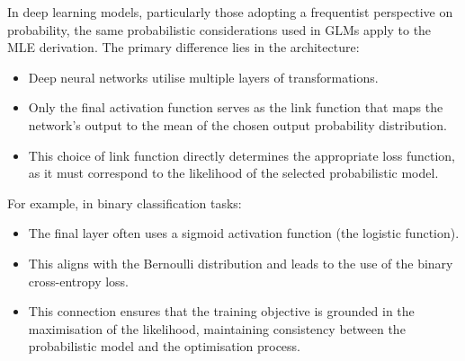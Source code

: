 In deep learning models, particularly those adopting a frequentist perspective on probability, the same probabilistic considerations used in GLMs apply to the MLE derivation. The primary difference lies in the architecture:
\begin{itemize}
    \item Deep neural networks utilise multiple layers of transformations.
    \item Only the final activation function serves as the link function that maps the network's output to the mean of the chosen output probability distribution.
    \item This choice of link function directly determines the appropriate loss function, as it must correspond to the likelihood of the selected probabilistic model.
\end{itemize}

For example, in binary classification tasks:
\begin{itemize}
    \item The final layer often uses a sigmoid activation function (the logistic function).
    \item This aligns with the Bernoulli distribution and leads to the use of the binary cross-entropy loss.
    \item This connection ensures that the training objective is grounded in the maximisation of the likelihood, maintaining consistency between the probabilistic model and the optimisation process.
\end{itemize}




